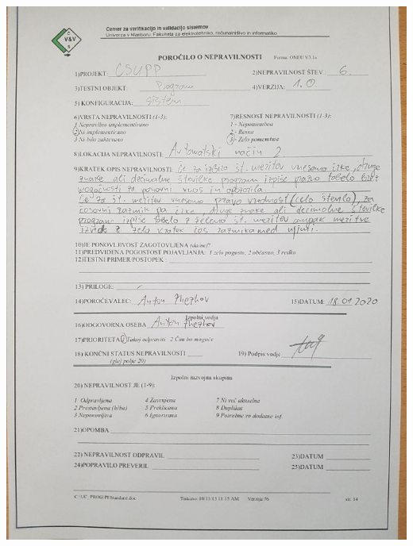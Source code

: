 \documentclass[a4paper,12pt]{article}
\begin{document}
{	\includegraphics[width=15cm]{porocila/06.jpg}
	
\newpage
	
	\hspace{2cm}

	\vspace{2cm}
	
}
\end{document}
